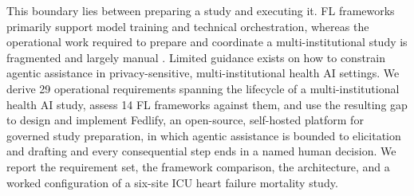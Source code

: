 \documentclass[preprint,5p, 10pt, times]{elsarticle}
\begin{document}
This boundary lies between preparing a study and executing it. FL frameworks primarily support model training and technical orchestration, whereas the operational work required to prepare and coordinate a multi-institutional study is fragmented and largely manual \cite{teo2024federated,li2025challenges,eden2025scoping,cremonesi2025fed}.
Limited guidance exists on how to constrain agentic assistance in privacy-sensitive, multi-institutional health AI settings.
%
We derive 29 operational requirements spanning the lifecycle of a multi-institutional health AI study, assess 14 FL frameworks against them, and use the resulting gap to design and implement Fedlify, an open-source, self-hosted platform for governed study preparation, in which agentic assistance is bounded to elicitation and drafting and every consequential step ends in a named human decision. 
We report the requirement set, the framework comparison, the architecture, and a worked configuration of a six-site ICU heart failure mortality study.





\end{document}

